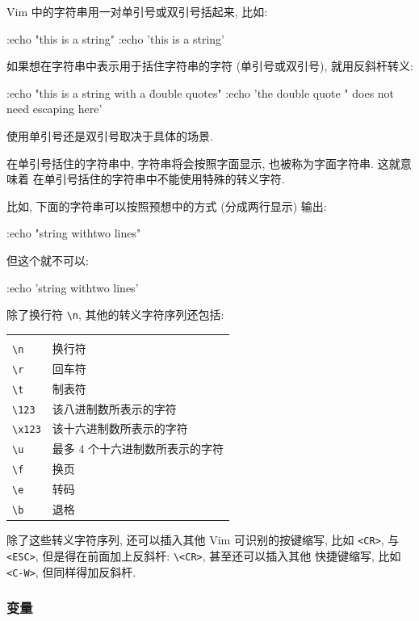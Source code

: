 Vim 中的字符串用一对单引号或双引号括起来, 比如:
\begin{vimcode}
:echo "this is a string"
:echo 'this is a string'
\end{vimcode}

如果想在字符串中表示用于括住字符串的字符 (单引号或双引号), 就用反斜杆转义:
\begin{vimcode}
:echo "this is a string with a \" double quotes"
:echo 'the double quote " does not need escaping here'
\end{vimcode}

使用单引号还是双引号取决于具体的场景.

在单引号括住的字符串中, 字符串将会按照字面显示, 也被称为字面字符串. 这就意味着
在单引号括住的字符串中不能使用特殊的转义字符.

比如, 下面的字符串可以按照预想中的方式 (分成两行显示) 输出:
\begin{vimcode}
:echo "string with\n two lines"
\end{vimcode}
但这个就不可以:
\begin{vimcode}
:echo 'string with\n two lines'
\end{vimcode}

除了换行符 \verb'\n', 其他的转义字符序列还包括:

\begin{center}
\begin{tabular}{ll}
   \hline \\
   \verb'\n'    & 换行符 \\
   \verb'\r'    & 回车符 \\
   \verb'\t'    & 制表符 \\
   \verb'\123'  & 该八进制数所表示的字符 \\
   \verb'\x123' & 该十六进制数所表示的字符 \\
   \verb'\u'    & 最多 4 个十六进制数所表示的字符 \\
   \verb'\f'    & 换页 \\
   \verb'\e'    & 转码 \\
   \verb'\b'    & 退格 \\
   \hline
\end{tabular}
\end{center}

除了这些转义字符序列, 还可以插入其他 Vim 可识别的按键缩写, 比如 \texttt{<CR>},
与 \texttt{<ESC>}, 但是得在前面加上反斜杆: \verb'\<CR>', 甚至还可以插入其他
快捷键缩写, 比如 \texttt{<C-W>}, 但同样得加反斜杆.

\subsubsection{变量}
\label{subsubsec:variables}

